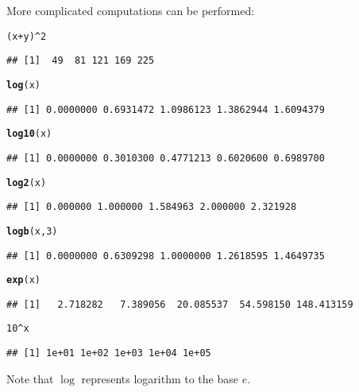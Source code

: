 \documentclass[12pt,A4,makeidx]{article}\usepackage[]{graphicx}\usepackage[]{xcolor}
\makeatletter
\newcommand{\hlnum}[1]{\textcolor[rgb]{0.686,0.059,0.569}{#1}}%
\newcommand{\hlopt}[1]{\textcolor[rgb]{0,0,0}{#1}}%
\newcommand{\hlstd}[1]{\textcolor[rgb]{0.345,0.345,0.345}{#1}}%
\newcommand{\hlkwd}[1]{\textcolor[rgb]{0.737,0.353,0.396}{\textbf{#1}}}%
\newenvironment{kframe}{%
 \def\at@end@of@kframe{}%
 \ifinner\ifhmode%
  \def\at@end@of@kframe{\end{minipage}}%
  \begin{minipage}{\columnwidth}%
 \fi\fi%
 \def\FrameCommand##1{\hskip\@totalleftmargin \hskip-\fboxsep
 \colorbox{shadecolor}{##1}\hskip-\fboxsep
     \hskip-\linewidth \hskip-\@totalleftmargin \hskip\columnwidth}%
 \MakeFramed {\advance\hsize-\width
   \@totalleftmargin\z@ \linewidth\hsize
   \@setminipage}}%
 {\par\unskip\endMakeFramed%
 \at@end@of@kframe}
\newenvironment{knitrout}{}{} %
\makeatother
\begin{document}
More complicated computations can be performed:
\begin{knitrout}
\color{fgcolor}\begin{kframe}
\begin{alltt}
\hlstd{(x}\hlopt{+}\hlstd{y)}\hlopt{^}\hlnum{2}
\end{alltt}
\begin{verbatim}
## [1]  49  81 121 169 225
\end{verbatim}
\begin{alltt}
\hlkwd{log}\hlstd{(x)}
\end{alltt}
\begin{verbatim}
## [1] 0.0000000 0.6931472 1.0986123 1.3862944 1.6094379
\end{verbatim}
\begin{alltt}
\hlkwd{log10}\hlstd{(x)}
\end{alltt}
\begin{verbatim}
## [1] 0.0000000 0.3010300 0.4771213 0.6020600 0.6989700
\end{verbatim}
\begin{alltt}
\hlkwd{log2}\hlstd{(x)}
\end{alltt}
\begin{verbatim}
## [1] 0.000000 1.000000 1.584963 2.000000 2.321928
\end{verbatim}
\begin{alltt}
\hlkwd{logb}\hlstd{(x,}\hlnum{3}\hlstd{)}
\end{alltt}
\begin{verbatim}
## [1] 0.0000000 0.6309298 1.0000000 1.2618595 1.4649735
\end{verbatim}
\begin{alltt}
\hlkwd{exp}\hlstd{(x)}
\end{alltt}
\begin{verbatim}
## [1]   2.718282   7.389056  20.085537  54.598150 148.413159
\end{verbatim}
\begin{alltt}
\hlnum{10}\hlopt{^}\hlstd{x}
\end{alltt}
\begin{verbatim}
## [1] 1e+01 1e+02 1e+03 1e+04 1e+05
\end{verbatim}
\end{kframe}
\end{knitrout}

Note that $\log$ represents logarithm to the base $e$. 
\end{document}
